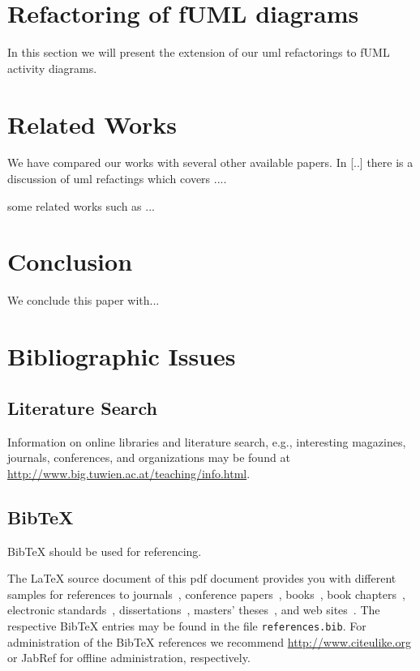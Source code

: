 \documentclass[a4paper,10pt]{article}
\begin{document}
\section{Refactoring of fUML diagrams}
In this section we will present the extension of our uml refactorings to fUML activity diagrams.

\section{Related Works}
We have compared our works with several other available papers. In [..] there is a discussion of uml refactings which covers ....

some related works such as ...

\section{Conclusion}
We conclude this paper with...

\section{Bibliographic Issues}

\subsection{Literature Search}

Information on online libraries and literature search, e.g., interesting magazines, journals, conferences, and organizations may be found at \url{http://www.big.tuwien.ac.at/teaching/info.html}.

\subsection{BibTeX}

BibTeX should be used for referencing.

The LaTeX source document of this pdf document provides you with different samples for references to journals~\cite{jour:B2BServices}, conference papers~\cite{proc:TheWebMLApproach}, books~\cite{book:umlatwork}, book chapters~\cite{incoll:ErhardKonrad1992}, electronic standards~\cite{man:BPEL}, dissertations~\cite{phdthesis:manuelWimmer}, masters' theses~\cite{mast:AUMLProfile}, and web sites~\cite{misc:BIGWebsite}. The respective BibTeX entries may be found in the file \texttt{references.bib}. For administration of the BibTeX references we recommend \url{http://www.citeulike.org} or JabRef for offline administration, respectively.



\end{document}
